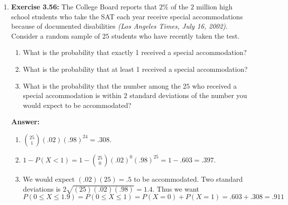 \documentclass[12pt]{article}
\theoremstyle{homework}
\begin{document}
\begin{enumerate}
\textbf{Answer:} 
\begin{enumerate}
\item $P(X\le3)=P(X=3)+P(X=2)+P(X=1)+P(X=0)={25\choose 3}(.05)^3(.95)^{22}+{25\choose 2}(.05)^2(.95)^{23}+{25\choose 1}(.05)(.95)^{24}+{25\choose 0}(.95){25}=0.093+0.231+0.365+0.277=.966$\\
\\
$P(X\le 3)=P(X=2)+P(X=1)+P(X=0)=0.231+0.365+0.277=.873$.
\item $P(X\ge 4)=1-P(X<3)=1-.873=.127$
\item $P(1\le X\le3)=P(X=1)+P(X=2)+P(X=3)=0.093+0.231+0.365=.689$.
\item $E(X)=np=25(.05)=1.25$, $\sigma_X=\sqrt{np(1-p)}=\sqrt{25(.05)(.95)}=\sqrt{1.25(.95)}=\sqrt{1.1875}\approx1.0897$
\item $.95^{50}=.077$.
\end{enumerate}
\vspace{.5in}







\item\hspace{.5in}\textbf{Exercise 3.56:} The College Board reports that $2\%$ of the $2$ million high school students who take the SAT each year receive special accommodations because of documented disabilities \emph{(Los Angeles Times, July 16, 2002)}. Consider a random sample of $25$ students who have recently taken the test.
\begin{enumerate}
\item What is the probability that exactly 1 received a special accommodation?
\item What is the probability that at least 1 received a special accommodation?
\addtocounter{enumii}{1}
\item What is the probability that the number among the $25$ who received a special accommodation is within $2$ standard deviations of the number you would expect to be accommodated?
\end{enumerate}

\textbf{Answer:} 
\begin{enumerate}
\item ${25 \choose 1}(.02)(.98)^{24}=.308$.
\item $1-P(X<1)=1-{25 \choose 0}(.02)^0(.98)^{25}=1-.603=.397$.
\addtocounter{enumii}{1}
\item We would expect $(.02)(25)=.5$ to be accommodated. Two standard deviations is $2\sqrt{(25)(.02)(.98)}=1.4$. Thus we want $P(0\le X\le 1.9)=P(0\le X\le 1)=P(X=0)+P(X=1)=.603+.308=.911$
\end{enumerate}
\vspace{.5in}








\end{enumerate}
\end{document}
